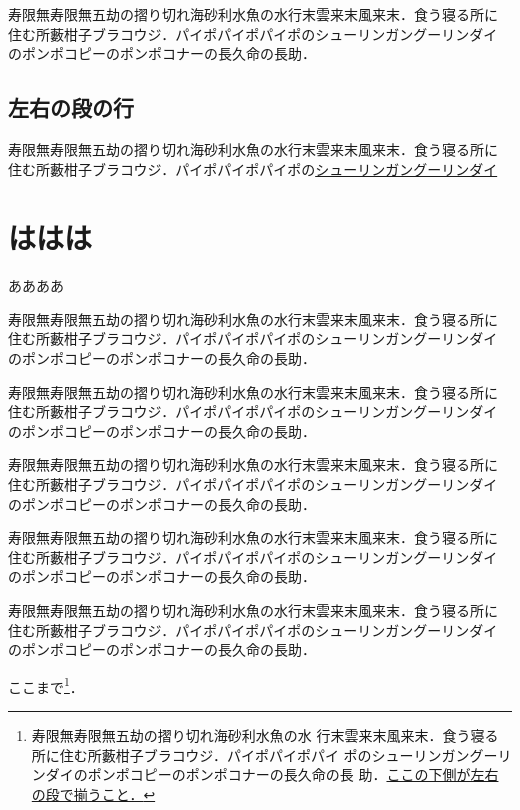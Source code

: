 \documentclass[a4j, 12Q, twocolumn, twoside, draft]{jsarticle}
\begin{document}
寿限無寿限無五劫の摺り切れ海砂利水魚の水行末雲来末風来末．食う寝る所に
住む所藪柑子ブラコウジ．パイポパイポパイポのシューリンガングーリンダイ
のポンポコピーのポンポコナーの長久命の長助．

\subsection{左右の段の行}


寿限無寿限無五劫の摺り切れ海砂利水魚の水行末雲来末風来末．食う寝る所に
住む所藪柑子ブラコウジ．パイポパイポパイポの\underline{シューリンガングーリンダイ}


\section{ははは}
ああああ

寿限無寿限無五劫の摺り切れ海砂利水魚の水行末雲来末風来末．食う寝る所に
住む所藪柑子ブラコウジ．パイポパイポパイポのシューリンガングーリンダイ
のポンポコピーのポンポコナーの長久命の長助．

寿限無寿限無五劫の摺り切れ海砂利水魚の水行末雲来末風来末．食う寝る所に
住む所藪柑子ブラコウジ．パイポパイポパイポのシューリンガングーリンダイ
のポンポコピーのポンポコナーの長久命の長助．

寿限無寿限無五劫の摺り切れ海砂利水魚の水行末雲来末風来末．食う寝る所に
住む所藪柑子ブラコウジ．パイポパイポパイポのシューリンガングーリンダイ
のポンポコピーのポンポコナーの長久命の長助．

寿限無寿限無五劫の摺り切れ海砂利水魚の水行末雲来末風来末．食う寝る所に
住む所藪柑子ブラコウジ．パイポパイポパイポのシューリンガングーリンダイ
のポンポコピーのポンポコナーの長久命の長助．

寿限無寿限無五劫の摺り切れ海砂利水魚の水行末雲来末風来末．食う寝る所に
住む所藪柑子ブラコウジ．パイポパイポパイポのシューリンガングーリンダイ
のポンポコピーのポンポコナーの長久命の長助．

ここまで\footnote{寿限無寿限無五劫の摺り切れ海砂利水魚の水
行末雲来末風来末．食う寝る所に住む所藪柑子ブラコウジ．パイポパイポパイ
ポのシューリンガングーリンダイのポンポコピーのポンポコナーの長久命の長
助．\underline{ここの下側が左右の段で揃うこと．}}．
\end{document}
